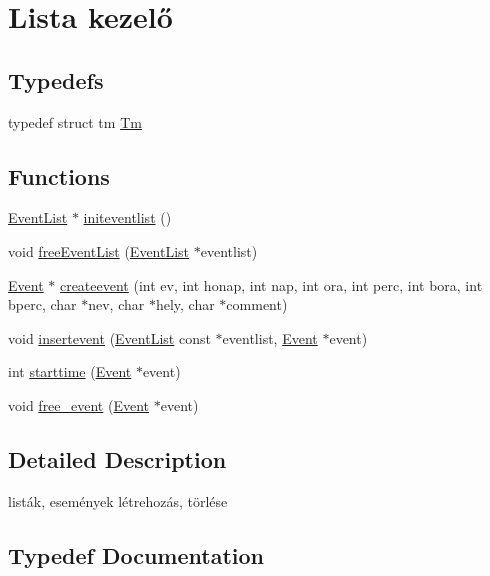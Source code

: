\hypertarget{group__list}{}\section{Lista kezelő}
\label{group__list}
\subsection*{Typedefs}
\begin{DoxyCompactItemize}
\item 
typedef struct tm \hyperlink{group__list_gaffc453d30a4a6ce81ed778fd04d2d256}{Tm}
\end{DoxyCompactItemize}
\subsection*{Functions}
\begin{DoxyCompactItemize}
\item 
\hyperlink{struct_event_list}{Event\+List} $\ast$ \hyperlink{group__list_ga48f44148563512bd32274821f478bd1b}{initeventlist} ()
\item 
void \hyperlink{group__list_ga4293a94245f5abec38c480114aa58b23}{free\+Event\+List} (\hyperlink{struct_event_list}{Event\+List} $\ast$eventlist)
\item 
\hyperlink{struct_event}{Event} $\ast$ \hyperlink{group__list_ga24fd1b37eee54600b66c42e86b52244a}{createevent} (int ev, int honap, int nap, int ora, int perc, int bora, int bperc, char $\ast$nev, char $\ast$hely, char $\ast$comment)
\item 
void \hyperlink{group__list_ga068e74dedbc5bf00dd54042ab3fac981}{insertevent} (\hyperlink{struct_event_list}{Event\+List} const $\ast$eventlist, \hyperlink{struct_event}{Event} $\ast$event)
\item 
int \hyperlink{group__list_ga8f7708495c6e39bb6e712218711b331f}{starttime} (\hyperlink{struct_event}{Event} $\ast$event)
\item 
void \hyperlink{group__list_gafd63217de3b7f7269aa3ee9d14b6b578}{free\+\_\+event} (\hyperlink{struct_event}{Event} $\ast$event)
\end{DoxyCompactItemize}


\subsection{Detailed Description}
listák, események létrehozás, törlése 

\subsection{Typedef Documentation}
\mbox{\label{group__list_gaffc453d30a4a6ce81ed778fd04d2d256}} 
